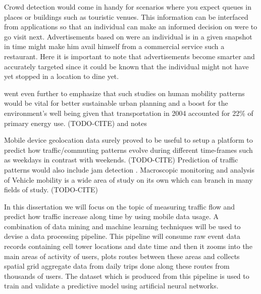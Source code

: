 \documentclass[12pt, a4paper]{report}
\theoremstyle{definition}
\theoremstyle{definition}%
\theoremstyle{definition}%
\theoremstyle{definition}%
\theoremstyle{definition}%
\theoremstyle{definition}%
\begin{document}
Crowd detection would come in handy for scenarios where you expect queues in places or buildings such as touristic venues. This information can be interfaced from applications so that an individual can make an informed decision on were to go visit next. Advertisements based on were an individual is in a given snapshot in time might make him avail himself from a commercial service such a restaurant. Here it is important to note that advertisements become smarter and accurately targeted since it could be known that the individual might not have yet stopped in a location to dine yet. 

\cite{Calabrese2013} went even further to emphasize that such studies on human mobility patterns would be vital for better sustainable urban planning and a boost for the environment's well being given that transportation in 2004 accounted for 22\% of primary energy use. (TODO-CITE) and notes

Mobile device geolocation data surely proved to be useful to setup a platform to predict how traffic/commuting patterns evolve during different time-frames such as weekdays in contrast with weekends. (TODO-CITE) Prediction of traffic patterns would also include jam detection \cite{Hoteit2014}.  Macroscopic monitoring and analysis of Vehicle mobility is a wide area of study on its own which can branch in many fields of study. (TODO-CITE)

In this dissertation we will focus on the topic of measuring traffic flow and predict how traffic increase along time by using mobile data usage. A combination of data mining and machine learning techniques will be used to devise a data processing pipeline. This pipeline will consume raw event data records containing cell tower locations and date time and then it zooms into the main areas of activity of users, plots routes between these areas and collects spatial grid aggregate data from daily trips done along these routes from thousands of users. The dataset which is produced from this pipeline is used to train and validate a predictive model using artificial neural networks.
\end{document}

